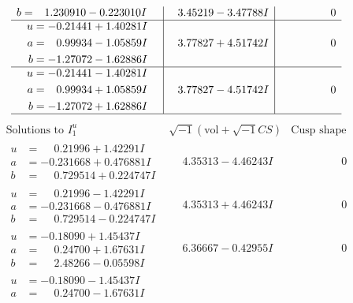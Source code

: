 \documentclass[1p]{elsarticle_modified}
\theoremstyle{definition}
\newcommand{\I}{\sqrt{-1}}
\begin{document}
$$\begin{array}{c|c|c}
\begin{aligned}
b &= \phantom{-}1.230910 - 0.223010 I\end{aligned}
 & \phantom{-}3.45219 - 3.47788 I & \phantom{-0.000000 } 0 \\ \hline\begin{aligned}
u &= -0.21441 + 1.40281 I \\
a &= \phantom{-}0.99934 - 1.05859 I \\
b &= -1.27072 - 1.62886 I\end{aligned}
 & \phantom{-}3.77827 + 4.51742 I & \phantom{-0.000000 } 0 \\ \hline\begin{aligned}
u &= -0.21441 - 1.40281 I \\
a &= \phantom{-}0.99934 + 1.05859 I \\
b &= -1.27072 + 1.62886 I\end{aligned}
 & \phantom{-}3.77827 - 4.51742 I & \phantom{-0.000000 } 0\\
 \hline 
 \end{array}$$\newpage$$\begin{array}{c|c|c}  
\text{Solutions to }I^u_{1}& \I (\text{vol} + \sqrt{-1}CS) & \text{Cusp shape}\\
 \hline 
\begin{aligned}
u &= \phantom{-}0.21996 + 1.42291 I \\
a &= -0.231668 + 0.476881 I \\
b &= \phantom{-}0.729514 + 0.224747 I\end{aligned}
 & \phantom{-}4.35313 - 4.46243 I & \phantom{-0.000000 } 0 \\ \hline\begin{aligned}
u &= \phantom{-}0.21996 - 1.42291 I \\
a &= -0.231668 - 0.476881 I \\
b &= \phantom{-}0.729514 - 0.224747 I\end{aligned}
 & \phantom{-}4.35313 + 4.46243 I & \phantom{-0.000000 } 0 \\ \hline\begin{aligned}
u &= -0.18090 + 1.45437 I \\
a &= \phantom{-}0.24700 + 1.67631 I \\
b &= \phantom{-}2.48266 - 0.05598 I\end{aligned}
 & \phantom{-}6.36667 - 0.42955 I & \phantom{-0.000000 } 0 \\ \hline\begin{aligned}
u &= -0.18090 - 1.45437 I \\
a &= \phantom{-}0.24700 - 1.67631 I \\

\end{aligned}
\end{array}$$
\end{document}
